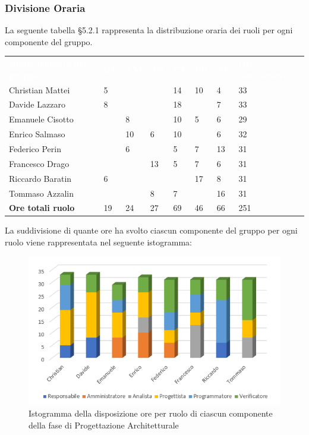 \subsubsection{Divisione Oraria}
La seguente tabella §5.2.1 rappresenta la distribuzione oraria dei ruoli per ogni componente del gruppo.
{
	\renewcommand{\arraystretch}{2}
	\centering
	\begin{longtable}{ C{5cm} C{1cm} C{1cm} C{1cm} C{1cm} C{1cm} C{1cm} C{3cm}}
		\textcolor{white}{\textbf{Nome membro del gruppo}} & \textcolor{white}{\textbf{RE}} & \textcolor{white}{\textbf{AM}} & \textcolor{white}{\textbf{AN}} & \textcolor{white}{\textbf{PT}} & \textcolor{white}{\textbf{PR}} & \textcolor{white}{\textbf{VE}} & \textcolor{white}{\textbf{Ore complessive}}\\	
        
        Christian Mattei & 5 & & & 14 & 10 & 4 & 33\\
        Davide Lazzaro & 8 & & & 18 & & 7 & 33 \\
        Emanuele Cisotto & & 8 & & 10 & 5 & 6 & 29 \\
        Enrico Salmaso & & 10 & 6 & 10 & & 6 & 32 \\
        Federico Perin & & 6 & & 5 & 7 & 13 &  31\\
        Francesco Drago & & & 13 & 5 & 7 & 6 & 31 \\
        Riccardo Baratin & 6 & & & & 17 & 8 & 31\\
        Tommaso Azzalin & & & 8 & 7 & & 16 & 31\\
        \textbf{Ore totali ruolo} & 19 & 24 & 27 & 69 & 46 & 66 & 251\\
		
	\end{longtable}
}

La suddivisione di quante ore ha svolto ciascun componente del gruppo per ogni ruolo viene rappresentata nel seguente istogramma:

\begin{figure}[h]
	\centering
	\includegraphics[scale=3]{sezioni/Istogrammi/IstogrammaProgettArchitetturale.png}
	\caption{Istogramma della disposizione ore per ruolo di ciascun componente della fase di Progettazione Architetturale}
\end{figure}

